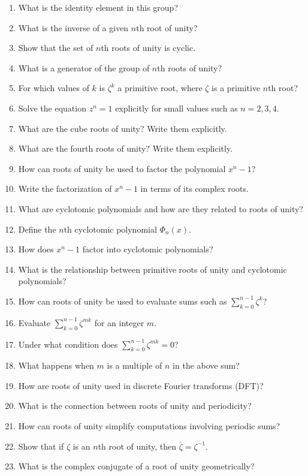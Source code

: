 \begin{enumerate}
  \item What is the identity element in this group?
  \item What is the inverse of a given \(n\)th root of unity?
  \item Show that the set of \(n\)th roots of unity is cyclic.
  \item What is a generator of the group of \(n\)th roots of unity?
  \item For which values of \(k\) is \(\zeta^{k}\) a primitive root, where \(\zeta\) is a primitive \(n\)th root?
  \item Solve the equation \(z^{n} = 1\) explicitly for small values such as \(n=2,3,4\).
  \item What are the cube roots of unity? Write them explicitly.
  \item What are the fourth roots of unity? Write them explicitly.
  \item How can roots of unity be used to factor the polynomial \(x^{n} - 1\)?
  \item Write the factorization of \(x^{n} - 1\) in terms of its complex roots.
  \item What are cyclotomic polynomials and how are they related to roots of unity?
  \item Define the \(n\)th cyclotomic polynomial \(\Phi_{n}(x)\).
  \item How does \(x^{n} - 1\) factor into cyclotomic polynomials?
  \item What is the relationship between primitive roots of unity and cyclotomic polynomials?
  \item How can roots of unity be used to evaluate sums such as \(\sum_{k=0}^{n-1}\zeta^{k}\)?
  \item Evaluate \(\sum_{k=0}^{n-1}\zeta^{mk}\) for an integer \(m\).
  \item Under what condition does \(\sum_{k=0}^{n-1}\zeta^{mk}= 0\)?
  \item What happens when \(m\) is a multiple of \(n\) in the above sum?
  \item How are roots of unity used in discrete Fourier transforms (DFT)?
  \item What is the connection between roots of unity and periodicity?
  \item How can roots of unity simplify computations involving periodic sums?
  \item Show that if \(\zeta\) is an \(n\)th root of unity, then \(\overline{\zeta}= \zeta^{-1}\).
  \item What is the complex conjugate of a root of unity geometrically?

\end{enumerate}
